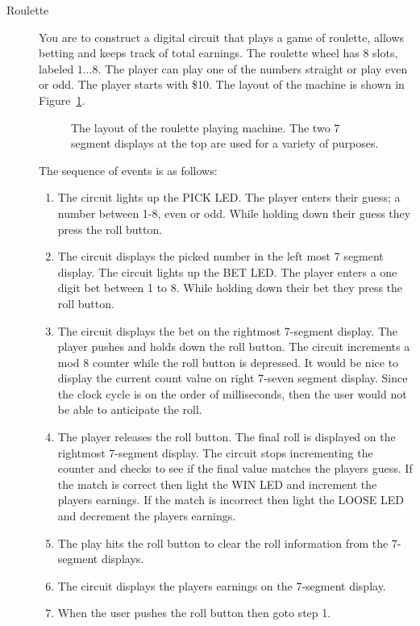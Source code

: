 \begin{description}
\item[Roulette]

You are to construct a digital circuit that plays a game of
roulette, allows betting and keeps track of total earnings.
The roulette wheel has 8 slots, labeled $1 \ldots 8$.  The player
can play one of the numbers straight or play even or odd.
The player starts with \$10. 
The layout of the machine is shown in Figure~\ref{fig:Roulette}.
\begin{figure}[ht]
\caption{The layout of the roulette playing machine.  
The two 7 segment displays at the top are used for a variety
of purposes.}
\label{fig:Roulette}
\end{figure}

The sequence of events is as follows:
\begin{enumerate}
\item	The circuit lights up the PICK LED.
    The player enters their guess; a number between 1-8, even or odd.
    While holding down their guess they press the roll button.
\item	The circuit displays the picked number in the left most
    7 segment display.  The circuit lights up the BET LED.
    The player enters a one digit bet between 1 to 8.  While holding
    down their bet they press the roll button.
\item 	The circuit displays the bet on the rightmost 7-segment
    display.
    The player pushes and holds down the roll button.
    The circuit increments a mod 8 counter while the roll 
    button is depressed. It would be nice to display the
    current count value on right 7-seven segment display.
    Since the clock cycle is on the order of milliseconds,
    then the user would not be able to anticipate the roll.
\item	The player releases the roll button.  The final roll
    is displayed on the rightmost 7-segment display.
    The circuit stops incrementing the counter and checks
    to see if the final value matches the players guess.
    If the match is correct then light the WIN LED and
    increment the players earnings.  If the match is incorrect
    then light the LOOSE LED and decrement the players
    earnings.
\item	The play hits the roll button to clear the roll information
    from the 7-segment displays.
\item	The circuit displays the players earnings on the 7-segment
    display.
\item	When the user pushes the roll button then goto step 1.
\end{enumerate}


\end{description}
